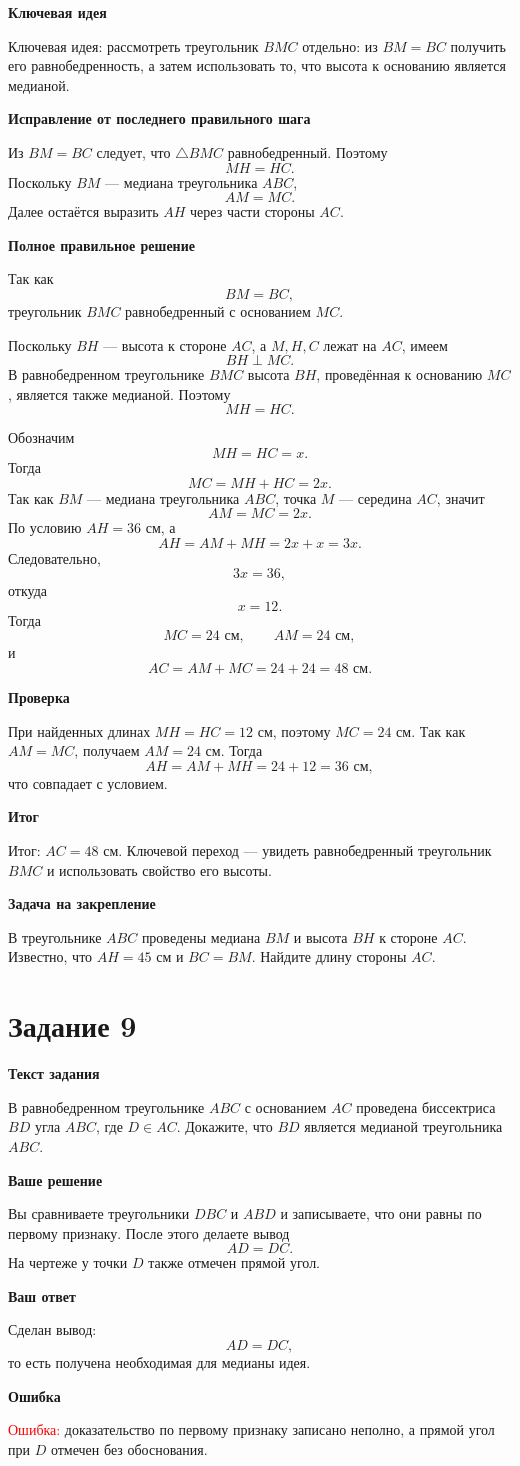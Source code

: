 \documentclass[12pt,a4paper]{article}
\newcommand{\tasktitle}[1]{%
  \phantomsection\label{task:#1}%
  \section*{Задание #1}%
}
\newcommand{\errorlabel}[1]{\textcolor{red}{Ошибка:} #1}
\newcommand{\keyidea}[1]{\textcolor{blue!60!black}{Ключевая идея:} #1}
\newcommand{\finalnote}[1]{\textcolor{teal!60!black}{Итог:} #1}
\newcommand{\subhead}[1]{\vspace{0.3em}\textbf{#1}\par}
\begin{document}
\subhead{Ключевая идея}
\keyidea{рассмотреть треугольник $BMC$ отдельно:
из $BM=BC$ получить его равнобедренность,
а затем использовать то, что высота к основанию является медианой.}

\subhead{Исправление от последнего правильного шага}
Из $BM=BC$ следует, что $\triangle BMC$ равнобедренный.
Поэтому
\[
MH=HC.
\]
Поскольку $BM$ --- медиана треугольника $ABC$,
\[
AM=MC.
\]
Далее остаётся выразить $AH$ через части стороны $AC$.

\subhead{Полное правильное решение}
Так как
\[
BM=BC,
\]
треугольник $BMC$ равнобедренный с основанием $MC$.

Поскольку $BH$ --- высота к стороне $AC$, а $M,H,C$ лежат на $AC$,
имеем
\[
BH\perp MC.
\]
В равнобедренном треугольнике $BMC$ высота $BH$,
проведённая к основанию $MC$, является также медианой.
Поэтому
\[
MH=HC.
\]

Обозначим
\[
MH=HC=x.
\]
Тогда
\[
MC=MH+HC=2x.
\]
Так как $BM$ --- медиана треугольника $ABC$,
точка $M$ --- середина $AC$, значит
\[
AM=MC=2x.
\]
По условию $AH=36$ см, а
\[
AH=AM+MH=2x+x=3x.
\]
Следовательно,
\[
3x=36,
\]
откуда
\[
x=12.
\]
Тогда
\[
MC=24\text{ см},\qquad AM=24\text{ см},
\]
и
\[
AC=AM+MC=24+24=48\text{ см}.
\]

\subhead{Проверка}
При найденных длинах $MH=HC=12$ см, поэтому $MC=24$ см.
Так как $AM=MC$, получаем $AM=24$ см.
Тогда
\[
AH=AM+MH=24+12=36\text{ см},
\]
что совпадает с условием.

\subhead{Итог}
\finalnote{$AC=48$ см.
Ключевой переход --- увидеть равнобедренный треугольник $BMC$
и использовать свойство его высоты.}

\subhead{Задача на закрепление}
В треугольнике $ABC$ проведены медиана $BM$ и высота $BH$
к стороне $AC$.
Известно, что $AH=45$ см и $BC=BM$.
Найдите длину стороны $AC$.

\newpage
\tasktitle{9}

\subhead{Текст задания}
В равнобедренном треугольнике $ABC$ с основанием $AC$
проведена биссектриса $BD$ угла $ABC$, где $D\in AC$.
Докажите, что $BD$ является медианой треугольника $ABC$.

\subhead{Ваше решение}
Вы сравниваете треугольники $DBC$ и $ABD$ и записываете, что они равны
по первому признаку. После этого делаете вывод
\[
AD=DC.
\]
На чертеже у точки $D$ также отмечен прямой угол.

\subhead{Ваш ответ}
Сделан вывод:
\[
AD=DC,
\]
то есть получена необходимая для медианы идея.

\subhead{Ошибка}
\errorlabel{доказательство по первому признаку записано неполно,
а прямой угол при $D$ отмечен без обоснования.}
\end{document}
